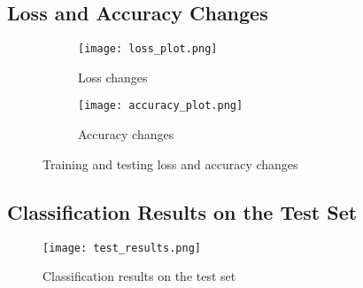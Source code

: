 \documentclass{article}
\begin{document}
\subsection{Loss and Accuracy Changes}
\begin{figure}[h]
    \centering
    \begin{subfigure}[b]{0.45\textwidth}
        \texttt{[image: loss\_plot.png]}
        \caption{Loss changes}
    \end{subfigure}
    \hfill
    \begin{subfigure}[b]{0.45\textwidth}
        \texttt{[image: accuracy\_plot.png]}
        \caption{Accuracy changes}
    \end{subfigure}
    \caption{Training and testing loss and accuracy changes}
\end{figure}

\subsection{Classification Results on the Test Set}
\begin{figure}[h]
    \centering
    \texttt{[image: test\_results.png]}
    \caption{Classification results on the test set}
\end{figure}
\end{document}
